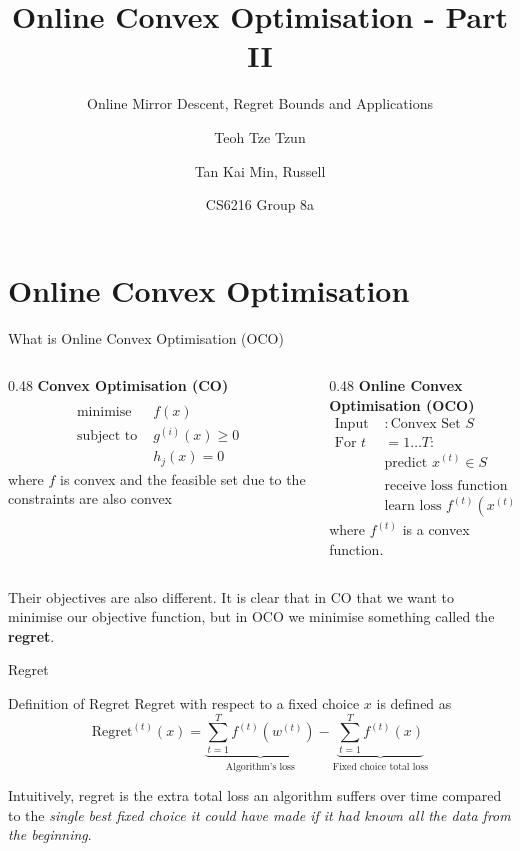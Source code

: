 \documentclass{beamer}
\title[Online Mirror Descent, Regret Bounds and Applications] %
{Online Convex Optimisation - Part II}
\subtitle{Online Mirror Descent, Regret Bounds and Applications}
\author[CS6216 Group 8a] %
{Teoh Tze Tzun\inst{1} \and Tan Kai Min, Russell\inst{1}}
\institute[VFU] %
{
  \inst{1}%
  School of Computing\\
  National University of Singapore
}
\date[VLC 2021] %
{CS6216 Group 8a}
\begin{document}
\frame{\titlepage}
\section{Online Convex Optimisation}
\begin{frame}{What is Online Convex Optimisation (OCO)}
\pause
\begin{columns}[t] %
        \begin{column}{0.48\textwidth}
            \textbf{Convex Optimisation (CO)}
            \begin{align*}\\
                \text{minimise } &f(x)\\
                \text{subject to }&g^{(i)}(x) \geq 0\\
                &h_j(x) =0
            \end{align*}
        where $f$ is convex and the feasible set due to the constraints are also convex
        \end{column}\pause       
        \begin{column}{0.48\textwidth}
            \textbf{Online Convex Optimisation (OCO)}
            \begin{align*}
                \text{Input }&: \text{Convex Set }S\\
                \text{For }t&=1\ldots T:\\
                &\text{predict } x^{(t)} \in S\\
                &\text{receive loss function }f^{(t)}: S \to \mathbb R\\
                &\text{learn loss }f^{(t)}(x^{(t)})
            \end{align*}
            where $f^{(t)}$ is a convex function.
        \end{column}
\end{columns}
\vspace{0.5cm}
\pause
Their objectives are also different. It is clear that in CO that we want to minimise our objective function, but in OCO we minimise something called the \textbf{regret}.
\end{frame}

\begin{frame}{Regret}
\begin{block}{Definition of Regret}
Regret with respect to a fixed choice $x$ is defined as
    \begin{equation}
    \text{Regret}^{(t)}(x) = \underbrace{\sum_{t=1}^T f^{(t)}(w^{(t)})}_{\text{Algorithm's loss}} - \underbrace{\sum_{t=1}^Tf^{(t)}(x)}_{\text{Fixed choice total loss}}
\end{equation}
\end{block}
\pause
Intuitively, regret is the extra total loss an algorithm suffers over time compared to the \textit{single best fixed choice it could have made if it had known all the data from the beginning}.
\end{frame}
\end{document}
